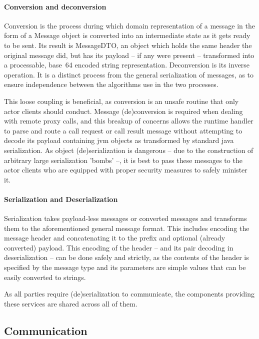 			\paragraph{Conversion and deconversion}
		
			Conversion is the process during which domain representation of a message in the form of a Message object is converted into an intermediate state as it gets ready to be sent. Its result is MessageDTO, an object which holds the same header the original message did, but has its payload -- if any were present -- transformed into a processable, base~64 encoded string representation. Deconversion is its inverse operation. It is a distinct process from the general serialization of messages, as to ensure independence between the algorithms use in the two processes.
			
			This loose coupling is beneficial, as conversion is an unsafe routine that only actor clients should conduct. Message (de)conversion is required when dealing with remote proxy calls, and this breakup of concerns allows the runtime handler to parse and route a call request or call result message without attempting to decode its payload containing jvm objects as transformed by standard java serialization. As object (de)serialization is dangerous -- due to the construction of arbitrary large serialization 'bombs' --, it is best to pass these messages to the actor clients who are equipped with proper security measures to safely minister it.

			\paragraph{Serialization and Deserialization}
			
			Serialization takes payload-less messages or converted messages and transforms them to the aforementioned general message format. This includes encoding the message header and concatenating it to the prefix and optional (already converted) payload. This encoding of the header -- and its pair decoding in deserialization -- can be done safely and strictly, as the contents of the header is specified by the message type and its parameters are simple values that can be easily converted to strings.
			
			As all parties require (de)serialization to communicate, the components providing these services are shared across all of them.

		\subsection{Communication}
		
